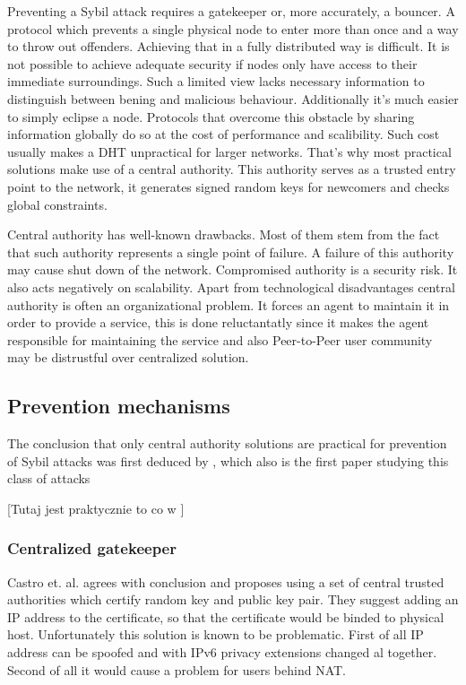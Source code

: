   Preventing a Sybil attack requires a gatekeeper or, more accurately, a
  bouncer. A protocol which prevents a single physical node to enter more than
  once and a way to throw out offenders. Achieving that in a fully distributed
  way is difficult. It is not possible to achieve adequate security if nodes
  only have access to their immediate surroundings. Such a limited view lacks
  necessary information to distinguish between bening and malicious behaviour.
  Additionally it's much easier to simply eclipse a node. Protocols that
  overcome this obstacle by sharing information globally do so at the cost of
  performance and scalibility. Such cost usually makes a DHT unpractical for
  larger networks. That's why most practical solutions make use of a central
  authority. This authority serves as a trusted entry point to the network, it
  generates signed random keys for newcomers and checks global constraints.

  Central authority has well-known drawbacks. Most of them stem from the fact
  that such authority represents a single point of failure. A failure of this
  authority may cause shut down of the network. Compromised authority is a
  security risk. It also acts negatively on scalability. Apart from
  technological disadvantages central authority is often an organizational
  problem. It forces an agent to maintain it in order to provide a service, this
  is done reluctantatly since it makes the agent responsible for maintaining the
  service and also Peer-to-Peer user community may be distrustful over
  centralized solution.

\subsection{Prevention mechanisms}

  The conclusion that only central authority solutions are practical for
  prevention of Sybil attacks was first deduced by \cite{dou02}, which also is
  the first paper studying this class of attacks \cite[p. 5]{urd11}

  [Tutaj jest praktycznie to co w \cite{urd11}]
  \subsubsection{Centralized gatekeeper}
  Castro et. al. \cite{cas02} agrees with \cite{dou02} conclusion and proposes
  using a set of central trusted authorities which certify random key and public
  key pair. They suggest adding an IP address to the certificate, so that the
  certificate would be binded to physical host. Unfortunately this solution is
  known to be problematic. First of all IP address can be spoofed and with IPv6
  privacy extensions changed al together. Second of all it would cause a problem
  for users behind NAT.


